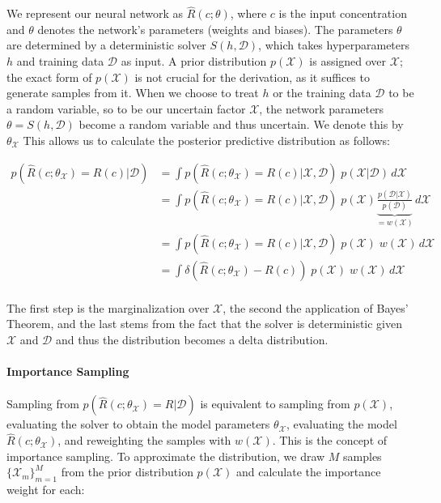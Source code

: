 We represent our neural network as $\hat{R}(c; \theta)$, where $c$ is the input concentration and $\theta$ denotes the network's parameters (weights and biases). The parameters $\theta$ are determined by a deterministic solver $S(h, \mathcal{D})$, which takes hyperparameters $h$ and training data $\mathcal{D}$ as input. A prior distribution $p(\mathcal{X})$ is assigned over $\mathcal{X}$; the exact form of $p(\mathcal{X})$ is not crucial for the derivation, as it suffices to generate samples from it.
When we choose to treat $h$ or the training data $\mathcal{D}$ to be a random variable, so to be our uncertain factor $\mathcal{X}$, the network parameters $\theta = S(h, \mathcal{D})$ become a random variable and thus uncertain. We denote this by $\theta_{\mathcal{X}}$ This allows us to calculate the posterior predictive distribution as follows:

\begin{align*}
p(\hat{R}(c; \theta_{\mathcal{X}}) = R(c)| \mathcal{D}) &= \int p(\hat{R}(c; \theta_{\mathcal{X}}) = R(c) | \mathcal{X}, \mathcal{D})\; p(\mathcal{X} | \mathcal{D}) \, d\mathcal{X} \\
                                          &= \int p(\hat{R}(c; \theta_{\mathcal{X}}) = R(c) | \mathcal{X}, \mathcal{D})\; p(\mathcal{X}) \underbrace{\frac{p(\mathcal{D} | \mathcal{X}) }{p(\mathcal{D})}}_{= w(\mathcal{X})} \, d\mathcal{X} \\
                                          &= \int p(\hat{R}(c; \theta_{\mathcal{X}}) = R(c) | \mathcal{X}, \mathcal{D})\; p(\mathcal{X})\; w(\mathcal{X}) \, d\mathcal{X} \\
                                          &= \int \delta(\hat{R}(c; \theta_{\mathcal{X}}) - R(c))\; p(\mathcal{X})\; w(\mathcal{X}) \, d\mathcal{X} \\
\end{align*}

The first step is the marginalization over $\mathcal{X}$, the second the application of Bayes' Theorem, and the last stems from the fact that the solver is deterministic given $\mathcal{X}$ and $\mathcal{D}$ and thus the distribution becomes a delta distribution.


\paragraph{Importance Sampling}

Sampling from $p(\hat{R}(c; \theta_{\mathcal{X}}) = R| \mathcal{D})$ is equivalent to sampling from $p(\mathcal{X})$, evaluating the solver to obtain the model parameters $\theta_{\mathcal{X}}$, evaluating the model $\hat{R}(c; \theta_{\mathcal{X}})$, and reweighting the samples with $w(\mathcal{X})$. This is the concept of importance sampling. To approximate the distribution, we draw $M$ samples $\{\mathcal{X}_m\}_{m=1}^M$ from the prior distribution $p(\mathcal{X})$ and calculate the importance weight for each:

